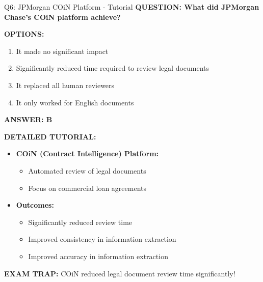 \documentclass[8pt]{beamer}
\begin{document}
	\begin{frame}{Q6: JPMorgan COiN Platform - Tutorial}
		\fontsize{6.5}{7.5}\selectfont
		\textbf{QUESTION: What did JPMorgan Chase's COiN platform achieve?}
		
		\vspace{0.1cm}
		\textbf{OPTIONS:}
		\begin{enumerate}
			\item It made no significant impact
			\item Significantly reduced time required to review legal documents
			\item It replaced all human reviewers
			\item It only worked for English documents
		\end{enumerate}
		
		\vspace{0.1cm}
		\textcolor{myblue}{\textbf{ANSWER: B}}
		
		\vspace{0.1cm}
		\textbf{DETAILED TUTORIAL:}
		\begin{itemize}
			\item \textbf{COiN (Contract Intelligence) Platform:}
			\begin{itemize}
				\item Automated review of legal documents
				\item Focus on commercial loan agreements
			\end{itemize}
			\item \textbf{Outcomes:}
			\begin{itemize}
				\item Significantly reduced review time
				\item Improved consistency in information extraction
				\item Improved accuracy in information extraction
			\end{itemize}
		\end{itemize}
		
		\textcolor{myred}{\textbf{EXAM TRAP:}} COiN reduced \textcolor{myblue}{legal document review time} significantly!
	\end{frame}
	
\end{document}

